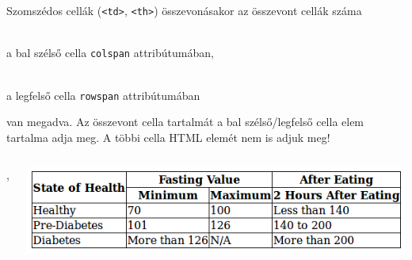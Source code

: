 \begin{frame}
  Szomszédos cellák (\texttt{<td>}, \texttt{<th>}) összevonásakor az összevont cellák száma
  \begin{description}[m]
    \item[vízszintes összevonásnál] \hfill \\ a bal szélső cella \texttt{colspan} attribútumában,
    \item[függőleges összevonásnál] \hfill \\ a legfelső cella \texttt{rowspan} attribútumában
  \end{description}
  van megadva. Az összevont cella tartalmát a bal szélső/legfelső cella elem tartalma adja meg. 
  A többi cella HTML elemét nem is adjuk meg!
\end{frame}

\begin{frame}
  \begin{columns}[c]
      \begin{exampleblock}{, }
        \scriptsize
        
      \end{exampleblock}
      \centering \includegraphics[width=\textwidth]{tabla21.png}
  \end{columns} 
\end{frame}

